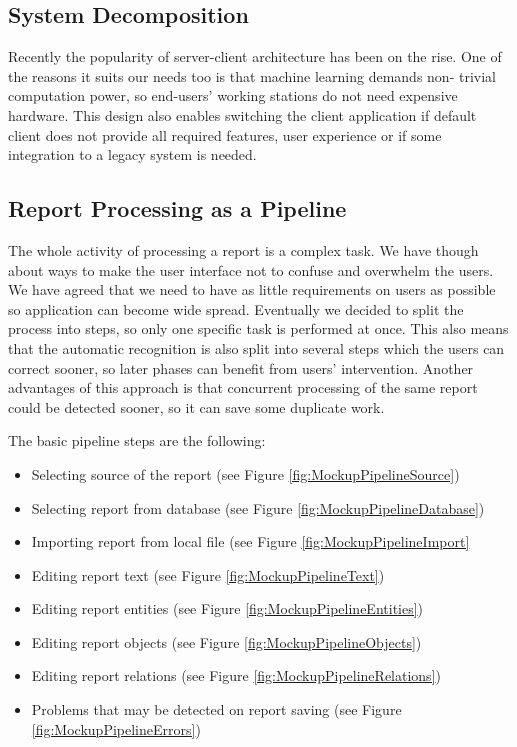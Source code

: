 \subsection{System Decomposition}




Recently the popularity of server-client architecture has been on the rise. One
of the reasons it suits our needs too is that machine learning demands non-
trivial computation power, so end-users' working stations do not need expensive
hardware. This design also enables switching the client application if default
\textan{} client does not provide all required features, user experience or if
some integration to a legacy system is needed.

\subsection{Report Processing as a Pipeline}
\label{ssec:ReportPipeline}


The whole activity of processing a report is a complex task. We have though
about ways to make the user interface not to confuse and overwhelm the users.
We have agreed that we need to have as little requirements on users as possible
so application can become wide spread. Eventually we decided to split the
process into steps, so only one specific task is performed at once. This also
means that the automatic recognition is also split into several steps which the
users can correct sooner, so later phases can benefit from users' intervention.
Another advantages of this approach is that concurrent processing of the same
report could be detected sooner, so it can save some duplicate work.

The basic pipeline steps are the following:
\begin{itemize}
	\item Selecting source of the report (see Figure \ref{fig:MockupPipelineSource})
	\item Selecting report from database (see Figure \ref{fig:MockupPipelineDatabase})
	\item Importing report from local file (see Figure \ref{fig:MockupPipelineImport}
	\item Editing report text (see Figure \ref{fig:MockupPipelineText})
	\item Editing report entities (see Figure \ref{fig:MockupPipelineEntities})
	\item Editing report objects (see Figure \ref{fig:MockupPipelineObjects})
	\item Editing report relations (see Figure \ref{fig:MockupPipelineRelations})
	\item Problems that may be detected on report saving (see Figure \ref{fig:MockupPipelineErrors})
\end{itemize}

